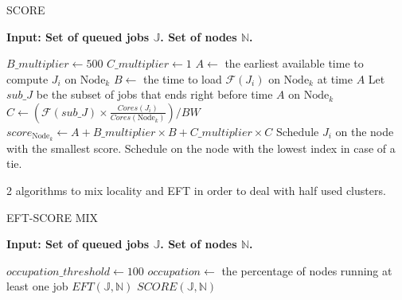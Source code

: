 \documentclass[a4paper]{article}
\newcommand{\Node}[1]{\ensuremath{\mathrm{Node}_{#1}}\xspace}
\newcommand{\inputs}{\ensuremath{\mathcal{F}}\xspace}
\newcommand{\memory}{\ensuremath{\mathcal{M}}\xspace}
\newcommand{\bandwidth}{\mathit{BW}\xspace}
\newcommand{\core}{\mathit{Cores}\xspace}
\newcommand{\jobset}{\ensuremath{\mathbb{J}}\xspace}
\newcommand{\nodeset}{\ensuremath{\mathbb{N}}\xspace}
\begin{document}
\begin{algorithm}[htbp]
\caption{SCORE}
\hspace*{\algorithmicindent} \textbf{Input: Set of queued jobs $\jobset$. Set of nodes $\nodeset$.}
\begin{algorithmic}[1]
\State $B\_multiplier \gets 500$
\State $C\_multiplier \gets 1$
\ForEach {$J_i \in \jobset$}
	\ForEach {$\Node{k} \in \nodeset$}
		\State $A \gets$ the earliest available time to compute $J_i$ on $\Node{k}$
		\State $B \gets$ the time to load $\inputs(J_i)$ on $\Node{k}$ at time $A$ 
		\State Let $\mathit{sub\_J}$ be the subset of jobs that ends right before time $A$ on $\Node{k}$
		\State $C \gets (\inputs(\mathit{sub\_J}) \times \frac{\core(J_i)}{\core(\Node{k})})/\bandwidth$
		\State $score_{\Node{k}} \gets A + B\_multiplier \times B + C\_multiplier \times C$
	\EndFor
	\State Schedule $J_i$ on the node with the smallest score. Schedule on the node with the lowest index in case of a tie.
\EndFor
\end{algorithmic}
\end{algorithm}

2 algorithms to mix locality and EFT in order to deal with half used clusters.

\begin{algorithm}[htbp]
\caption{EFT-SCORE MIX}
\hspace*{\algorithmicindent} \textbf{Input: Set of queued jobs $\jobset$. Set of nodes $\nodeset$.}
\begin{algorithmic}[1]
\State $occupation\_threshold \gets 100$ 
\State $occupation \gets$ the percentage of nodes running at least one job
		\State $EFT(\jobset,\nodeset)$
	\Else
		\State $SCORE(\jobset,\nodeset)$
	\EndIf
\end{algorithmic}
\end{algorithm}
\end{document}
